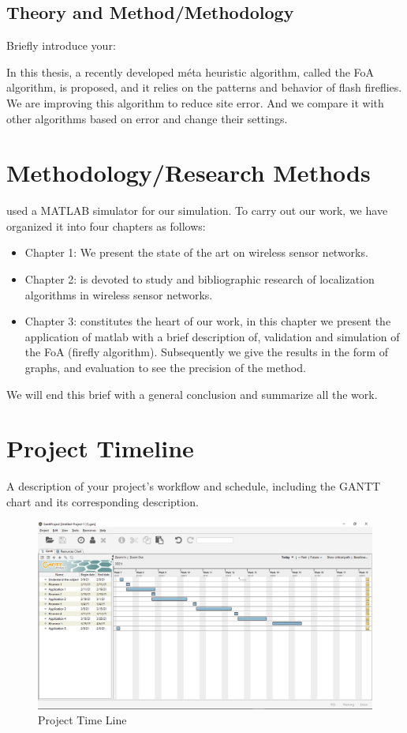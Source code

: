 \documentclass[paper=a4, fontsize=11pt]{scrartcl}
\numberwithin{equation}{section}		%
\numberwithin{figure}{section}			%
\numberwithin{table}{section}				%
\begin{document}
\subsection{Theory and Method/Methodology}
Briefly introduce your:

    In this thesis, a recently developed méta heuristic algorithm, called the FoA algorithm, is proposed, and it relies on the patterns and behavior of flash fireflies.
     We are improving this algorithm to reduce site error.
     And we compare it with other algorithms based on error and change their settings.


\section{Methodology/Research Methods}
used a MATLAB simulator for our simulation.
To carry out our work, we have organized it into four chapters as follows:
\begin{itemize}

    \item  Chapter 1: We present the state of the art on wireless sensor networks.
    \item Chapter 2: is devoted to study and bibliographic research of localization algorithms in wireless sensor networks. 
    \item Chapter 3: constitutes the heart of our work, in this chapter we present the application of matlab with a brief description of, validation and simulation of the FoA (firefly algorithm).  Subsequently we give the results in the form of graphs, and evaluation to see the precision of the method.

\end{itemize}
 We will end this brief with a general conclusion and summarize all the work.
\section{Project Timeline}
A description of your project's workflow and schedule, including the GANTT chart and its corresponding description.


\pagebreak

 \begin{figure}
    \centering
    \includegraphics[height=0.55\textwidth]{Figs/GG.jpg}
    \caption{Project Time Line}
    \label{fig:my_label}
\end{figure}

\pagebreak


\end{document}
